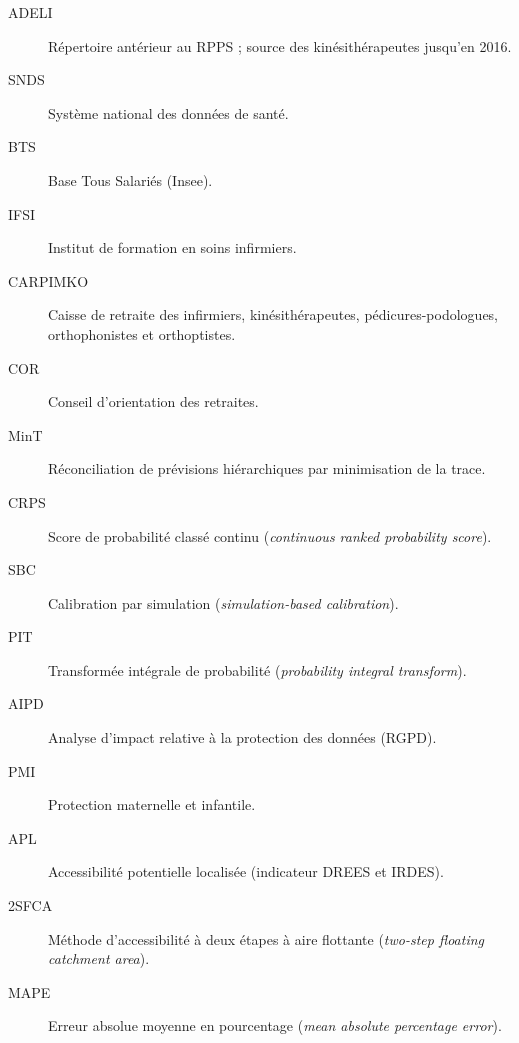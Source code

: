 {\begin{description}
\item[ADELI] Répertoire antérieur au RPPS ; source des kinésithérapeutes jusqu'en 2016.
\item[SNDS] Système national des données de santé.
\item[BTS] Base Tous Salariés (Insee).
\item[IFSI] Institut de formation en soins infirmiers.
\item[CARPIMKO] Caisse de retraite des infirmiers, kinésithérapeutes, pédicures-podologues, orthophonistes et
  orthoptistes.
\item[COR] Conseil d'orientation des retraites.
\item[MinT] Réconciliation de prévisions hiérarchiques par minimisation de la trace.
\item[CRPS] Score de probabilité classé continu (\emph{continuous ranked probability score}).
\item[SBC] Calibration par simulation (\emph{simulation-based calibration}).
\item[PIT] Transformée intégrale de probabilité (\emph{probability integral transform}).
\item[AIPD] Analyse d'impact relative à la protection des données (RGPD).
\item[PMI] Protection maternelle et infantile.
\item[APL] Accessibilité potentielle localisée (indicateur DREES et IRDES).
\item[2SFCA] Méthode d'accessibilité à deux étapes à aire flottante (\emph{two-step floating catchment area}).
\item[MAPE] Erreur absolue moyenne en pourcentage (\emph{mean absolute percentage error}).
\end{description}
}
